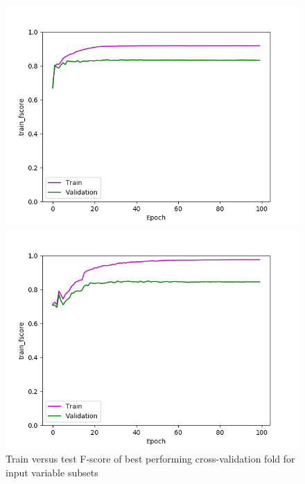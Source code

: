 \def\year{2017}\relax \documentclass[letterpaper]{article}
\begin{document}
\begin{figure}
\begin{minipage}{.24\textwidth}
  \centering
\includegraphics[width=\textwidth]{pics/d3_train_fscore_best_train_test.png}
\caption{$D_3$}\label{fig:d3fscoretraintest}
\end{minipage}
\begin{minipage}{.01\textwidth}
\end{minipage}
\begin{minipage}{.24\textwidth}
  \centering
\includegraphics[width=\textwidth]{pics/d4_train_fscore_best_train_test.png}
\caption{$D_4$}\label{fig:d4fscoretraintest}
\end{minipage}
\caption{Train versus test F-score of best performing cross-validation fold for input variable subsets}\label{fig:traintestfscore}
\end{figure}
\end{document}
